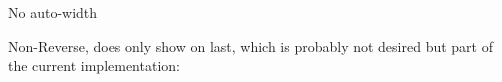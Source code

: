 \documentclass[
	aspectratio=169, %
	8pt, %
]{beamer}
\begin{document}
\begin{frame}{No auto-width}
	\begin{mycolumns}[columns=3,widths={10,10,80},animation=keep,reverse]
	\mynextcolumn
	\mynextcolumn
	\end{mycolumns}
	\begin{mycolumns}[columns=3,widths={10,10,80},animation=forget]
	\mynextcolumn
	\mynextcolumn
	\end{mycolumns}
	Non-Reverse, does only show on last, which is probably not desired but part of the current implementation:
	\begin{mycolumns}[columns=3,widths={10,80,10},reverse]
	\mynextcolumn
	\mynextcolumn
	\end{mycolumns}
\end{frame}



\end{document}
